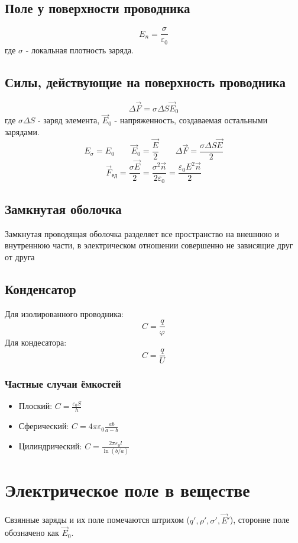 \documentclass{article}
\begin{document}
\subsection{Поле у поверхности проводника}
\[E_{n}=\frac{\sigma}{\varepsilon_{0}}\]
где $\sigma$ - локальная плотность заряда.

\subsection{Силы, действующие на поверхность проводника}
\[\varDelta\vec{F}=\sigma\varDelta S\vec{E}_{0}\]
где $\sigma\varDelta S$ - заряд элемента, $\vec{E}_{0}$ - напряженность, создаваемая остальными зарядами.
\[
    E_{\sigma}=E_{0} \qquad
    \vec{E}_{0}=\frac{\vec{E}}{2} \qquad
    \varDelta\vec{F}=\frac{\sigma\varDelta S\vec{E}}{2}
\]
\[
    \vec{F}_{\text{ед}}=\frac{\sigma\vec{E}}{2}=\frac{\sigma^2\vec{n}}{2\varepsilon_{0}}=\frac{\varepsilon_{0}E^2\vec{n}}{2}
\]

\subsection{Замкнутая оболочка}
Замкнутая проводящая оболочка разделяет все пространство на внешнюю и внутреннюю части, в электрическом отношении совершенно не зависящие друг от друга

\subsection{Конденсатор}
Для изолированного проводника:
\[C=\frac{q}{\varphi}\]
Для кондесатора:
\[C=\frac{q}{U}\]
\subsubsection{Частные случаи ёмкостей}
\begin{itemize}
    \item Плоский: $C=\frac{\varepsilon_{0}S}{h}$
    \item Сферический: $C=4\pi\varepsilon_{0}\frac{ab}{a-b}$
    \item Цилиндрический: $C=\frac{2\pi\varepsilon_{0}l}{\ln(b/a)}$
\end{itemize}


\section{Электрическое поле в веществе}
Свзянные заряды и их поле помечаются штрихом ($q', \rho', \sigma', \vec{E}'$), сторонне поле обозначено как $\vec{E}_{0}$.
\end{document}
